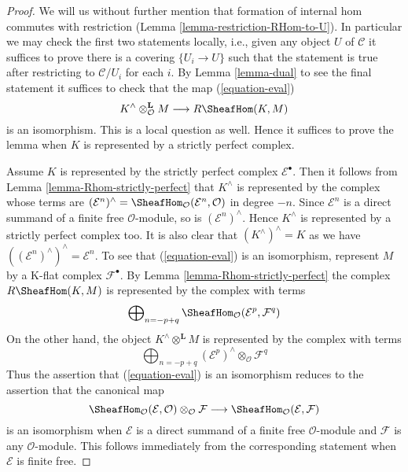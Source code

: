\begin{proof}
We will us without further mention that formation of internal hom commutes
with restriction (Lemma \ref{lemma-restriction-RHom-to-U}).
In particular we may check the first two statements locally, i.e., given
any object $U$ of $\mathcal{C}$ it suffices to prove there is a covering
$\{U_i \to U\}$ such that the statement is true after restricting to
$\mathcal{C}/U_i$ for each $i$.
By Lemma \ref{lemma-dual} to see the final statement it suffices to check
that the map (\ref{equation-eval})
$$
K^\wedge \otimes^\mathbf{L}_\mathcal{O} M
\longrightarrow
R\SheafHom(K, M)
$$
is an isomorphism. This is a local question as well.
Hence it suffices to prove the lemma when $K$ is represented
by a strictly perfect complex.

\medskip\noindent
Assume $K$ is represented by the strictly perfect complex
$\mathcal{E}^\bullet$. Then it follows from
Lemma \ref{lemma-Rhom-strictly-perfect}
that $K^\wedge$ is represented by the complex whose terms are
$(\mathcal{E}^n)^\wedge =
\SheafHom_\mathcal{O}(\mathcal{E}^n, \mathcal{O})$
in degree $-n$. Since $\mathcal{E}^n$ is a direct summand of a finite
free $\mathcal{O}$-module, so is $(\mathcal{E}^n)^\wedge$.
Hence $K^\wedge$ is represented by a strictly perfect complex too.
It is also clear that $(K^\wedge)^\wedge = K$ as we have
$((\mathcal{E}^n)^\wedge)^\wedge = \mathcal{E}^n$.
To see that (\ref{equation-eval}) is an isomorphism, represent
$M$ by a K-flat complex $\mathcal{F}^\bullet$.
By Lemma \ref{lemma-Rhom-strictly-perfect} the complex
$R\SheafHom(K, M)$ is represented by the complex with terms
$$
\bigoplus\nolimits_{n = -p + q}
\SheafHom_\mathcal{O}(\mathcal{E}^p, \mathcal{F}^q)
$$
On the other hand, the object $K^\wedge \otimes^\mathbf{L} M$
is represented by the complex with terms
$$
\bigoplus\nolimits_{n = -p + q}
(\mathcal{E}^p)^\wedge \otimes_\mathcal{O} \mathcal{F}^q
$$
Thus the assertion that (\ref{equation-eval}) is an isomorphism
reduces to the assertion that the canonical map
$$
\SheafHom_\mathcal{O}(\mathcal{E}, \mathcal{O})
\otimes_\mathcal{O} \mathcal{F}
\longrightarrow
\SheafHom_\mathcal{O}(\mathcal{E}, \mathcal{F})
$$
is an isomorphism when $\mathcal{E}$ is a direct summand of a finite
free $\mathcal{O}$-module and $\mathcal{F}$ is any $\mathcal{O}$-module.
This follows immediately from the corresponding statement when
$\mathcal{E}$ is finite free.
\end{proof}





